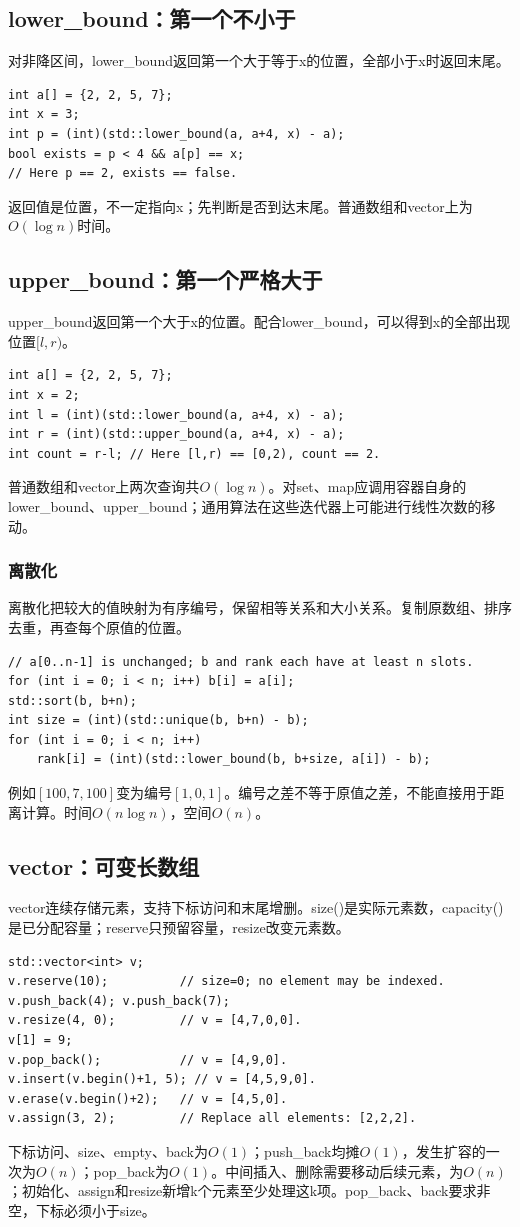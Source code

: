 \subsection{lower\_bound：第一个不小于}
对非降区间，lower\_bound返回第一个大于等于x的位置，全部小于x时返回末尾。
\begin{lstlisting}
int a[] = {2, 2, 5, 7};
int x = 3;
int p = (int)(std::lower_bound(a, a+4, x) - a);
bool exists = p < 4 && a[p] == x;
// Here p == 2, exists == false.
\end{lstlisting}
返回值是位置，不一定指向x；先判断是否到达末尾。普通数组和vector上为$O(\log n)$时间。
\subsection{upper\_bound：第一个严格大于}
upper\_bound返回第一个大于x的位置。配合lower\_bound，可以得到x的全部出现位置$[l,r)$。
\begin{lstlisting}
int a[] = {2, 2, 5, 7};
int x = 2;
int l = (int)(std::lower_bound(a, a+4, x) - a);
int r = (int)(std::upper_bound(a, a+4, x) - a);
int count = r-l; // Here [l,r) == [0,2), count == 2.
\end{lstlisting}
普通数组和vector上两次查询共$O(\log n)$。对set、map应调用容器自身的lower\_bound、upper\_bound；通用算法在这些迭代器上可能进行线性次数的移动。

\subsubsection{离散化}
离散化把较大的值映射为有序编号，保留相等关系和大小关系。复制原数组、排序去重，再查每个原值的位置。
\begin{lstlisting}
// a[0..n-1] is unchanged; b and rank each have at least n slots.
for (int i = 0; i < n; i++) b[i] = a[i];
std::sort(b, b+n);
int size = (int)(std::unique(b, b+n) - b);
for (int i = 0; i < n; i++)
    rank[i] = (int)(std::lower_bound(b, b+size, a[i]) - b);
\end{lstlisting}
例如$[100,7,100]$变为编号$[1,0,1]$。编号之差不等于原值之差，不能直接用于距离计算。时间$O(n\log n)$，空间$O(n)$。

\subsection{vector：可变长数组}
vector连续存储元素，支持下标访问和末尾增删。size()是实际元素数，capacity()是已分配容量；reserve只预留容量，resize改变元素数。
\begin{lstlisting}
std::vector<int> v;
v.reserve(10);          // size=0; no element may be indexed.
v.push_back(4); v.push_back(7);
v.resize(4, 0);         // v = [4,7,0,0].
v[1] = 9;
v.pop_back();           // v = [4,9,0].
v.insert(v.begin()+1, 5); // v = [4,5,9,0].
v.erase(v.begin()+2);   // v = [4,5,0].
v.assign(3, 2);         // Replace all elements: [2,2,2].
\end{lstlisting}
下标访问、size、empty、back为$O(1)$；push\_back均摊$O(1)$，发生扩容的一次为$O(n)$；pop\_back为$O(1)$。中间插入、删除需要移动后续元素，为$O(n)$；初始化、assign和resize新增k个元素至少处理这k项。pop\_back、back要求非空，下标必须小于size。

